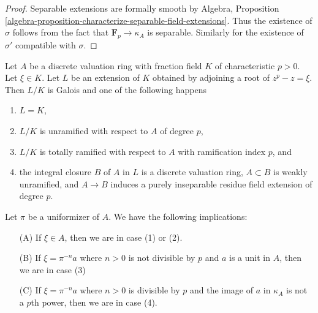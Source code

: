 \begin{proof}
Separable extensions are formally smooth by Algebra, Proposition
\ref{algebra-proposition-characterize-separable-field-extensions}.
Thus the existence of $\sigma$ follows from the fact that
$\mathbf{F}_p \to \kappa_A$ is separable.
Similarly for the existence of $\sigma'$ compatible with $\sigma$.
\end{proof}

\begin{lemma}
\label{lemma-pre-characteristic-p-case}
Let $A$ be a discrete valuation ring with fraction field $K$ of characteristic
$p > 0$. Let $\xi \in K$. Let $L$ be an extension of $K$ obtained by
adjoining a root of $z^p - z = \xi$. Then $L/K$ is Galois and one of the
following happens
\begin{enumerate}
\item $L = K$,
\item $L/K$ is unramified with respect to $A$ of degree $p$,
\item $L/K$ is totally ramified with respect to $A$
with ramification index $p$, and
\item the integral closure $B$ of $A$ in $L$ is a discrete valuation ring,
$A \subset B$ is weakly unramified, and $A \to B$ induces a purely inseparable
residue field extension of degree $p$.
\end{enumerate}
Let $\pi$ be a uniformizer of $A$. We have the following implications:
\begin{enumerate}
\item[(A)] If $\xi \in A$, then we are in case (1) or (2).
\item[(B)] If $\xi = \pi^{-n}a$ where $n > 0$ is not divisible by
$p$ and $a$ is a unit in $A$, then we are in case (3)
\item[(C)] If $\xi = \pi^{-n} a$ where $n > 0$ is divisible by $p$ and
the image of $a$ in $\kappa_A$ is not a $p$th power, then we are in case (4).
\end{enumerate}
\end{lemma}

